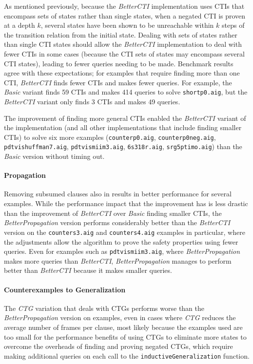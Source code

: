 \documentclass[12pt,a4paper,twoside,openright]{report}
\begin{document}
{{As mentioned previously, because the \emph{BetterCTI} implementation uses
CTIs that encompass sets of states rather than single states, when a negated CTI is proven at a depth
$k$, several states have been shown to be unreachable within $k$ steps of the transition relation
from the initial state. Dealing with sets of states rather than single CTI states should allow
the \emph{BetterCTI} implementation to deal with fewer CTIs in some cases (because the CTI sets of states
may encompass several CTI states), leading to fewer queries needing to be made. Benchmark results
agree with these expectations; for examples that require finding more than one CTI, \emph{BetterCTI}
finds fewer CTIs and makes fewer queries. For example, the \emph{Basic} variant finds 59
CTIs and makes 414 queries to solve \verb,shortp0.aig,, but the \emph{BetterCTI} variant only
finds 3 CTIs and makes 49 queries.

The improvement of finding more general CTIs enabled the \emph{BetterCTI} variant of the implementation
(and all other implementations that include finding smaller CTIs) to
solve six more examples (\verb,counterp0.aig,, \verb,counterp0neg.aig,, \verb,pdtvishuffman7.aig,, 
\verb,pdtvismiim3.aig,, \verb,6s318r.aig,, \verb,srg5ptimo.aig,) than the \emph{Basic} version without
timing out.}

\paragraph{Propagation}{
Removing subsumed clauses also in results in better performance for several examples.
While the performance impact that the improvement has is less drastic than the improvement of
\emph{BetterCTI} over \emph{Basic} finding smaller CTIs, the \emph{BetterPropagation} version performs
considerably better
than the \emph{BetterCTI} version on the \verb,counters3.aig, and \verb,counters4.aig, examples in
particular, where the adjustments allow the algorithm to prove the safety properties using fewer
queries. Even for examples such as \verb,pdtvismiim3.aig,, where \emph{BetterPropagation} makes more
queries than \emph{BetterCTI}, \emph{BetterPropagation} manages to perform better than \emph{BetterCTI}
because it makes smaller queries.}

\paragraph{Counterexamples to Generalization}{
The \emph{CTG} variation that deals with CTGs performs worse than the \emph{BetterPropagation} version
on examples, even in cases where \emph{CTG} reduces the average number of frames per clause,
most likely because the examples used are too small for the performance benefits of using CTGs to
eliminate more states to overcome the overheads of finding and proving negated CTGs, which require
making additional queries on each call to the \verb,inductiveGeneralization, function.

}}
\end{document}
